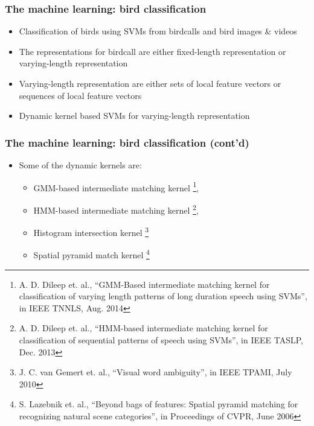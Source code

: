 \documentclass[mathserif]{beamer}
\begin{document}
\begin{frame}
\frametitle{The machine learning: bird classification}
\begin{itemize}
\item<2-> Classification of birds using SVMs from birdcalls and bird images \& videos
\item<3-> The representations for birdcall are either fixed-length
representation or varying-length representation
\item<4-> Varying-length representation are either sets of local feature vectors or sequences of local feature vectors
\item<5-> Dynamic kernel based SVMs for varying-length representation
\end{itemize}
\end{frame}

\begin{frame}
\frametitle{The machine learning: bird classification (cont'd)}
\begin{itemize}
\item<2-> Some of the dynamic kernels are:
\begin{itemize}
	\item GMM-based intermediate matching kernel \footnote{
	A. D. Dileep et. al., ``GMM-Based intermediate matching kernel for classification of varying length patterns of long duration speech using SVMs'', in IEEE TNNLS, Aug. 2014},
	\item HMM-based intermediate matching kernel \footnote{A. D. Dileep et. al., ``HMM-based intermediate matching kernel for classification of sequential patterns of speech using SVMs'', in IEEE TASLP, Dec. 2013}, 
	\item Histogram intersection kernel \footnote{J. C. van Gemert et. al., ``Visual word ambiguity'', in IEEE TPAMI, July 2010} 
	\item Spatial pyramid match kernel \footnote{S. Lazebnik et. al., ``Beyond bags of features: Spatial pyramid matching for recognizing natural scene categories'', in Proceedings of CVPR, June 2006} \end{itemize}
\end{itemize}
\end{frame}
\end{document}
